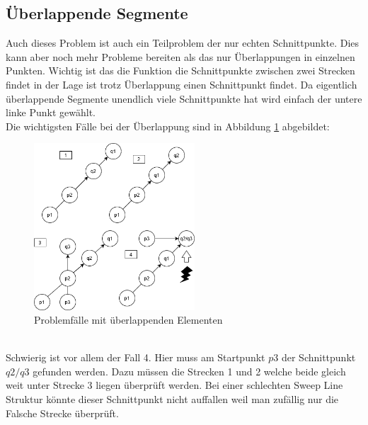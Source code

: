\documentclass[conference]{IEEEtran}
\begin{document}
	\subsection{Überlappende Segmente}
	Auch dieses Problem ist auch ein Teilproblem der nur echten Schnittpunkte. Dies kann aber noch mehr Probleme bereiten als das nur Überlappungen in einzelnen Punkten. Wichtig ist das die Funktion die Schnittpunkte zwischen zwei Strecken findet in der Lage ist trotz Überlappung einen Schnittpunkt findet. Da eigentlich überlappende Segmente unendlich viele Schnittpunkte hat wird einfach der untere linke Punkt gewählt.\\
	Die wichtigsten Fälle bei der Überlappung sind in Abbildung \ref{uberlap} abgebildet:
	\begin{figure}[h]
		\begin{center}
			\includegraphics[width=6cm]{ProblemUberlappen.png}
			\caption{Problemfälle mit überlappenden Elementen}
			\label{uberlap}
		\end{center}
	\end{figure}\\
	Schwierig ist vor allem der Fall 4. Hier muss am Startpunkt $p3$ der Schnittpunkt $q2/q3$ gefunden werden. Dazu müssen die Strecken 1 und 2 welche beide gleich weit unter Strecke 3 liegen überprüft werden. Bei einer schlechten Sweep Line Struktur könnte dieser Schnittpunkt nicht auffallen weil man zufällig nur die Falsche Strecke überprüft.
	
\end{document}
